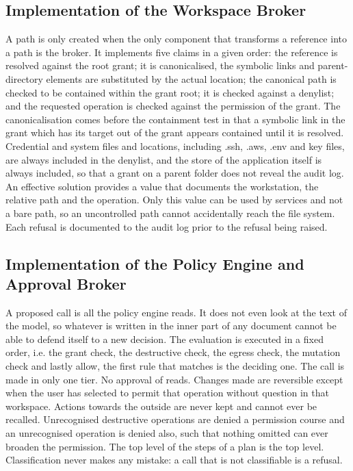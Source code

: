 \documentclass{FastFyp}
\begin{document}
\subsection{Implementation of the Workspace Broker}
A path is only created when the only component that transforms a reference into a path is the broker. It implements five claims in a given order: the reference is resolved against the root grant; it is canonicalised, the symbolic links and parent-directory elements are substituted by the actual location; the canonical path is checked to be contained within the grant root; it is checked against a denylist; and the requested operation is checked against the permission of the grant. The canonicalisation comes before the containment test in that a symbolic link in the grant which has its target out of the grant appears contained until it is resolved. Credential and system files and locations, including .ssh, .aws, .env and key files, are always included in the denylist, and the store of the application itself is always included, so that a grant on a parent folder does not reveal the audit log. An effective solution provides a value that documents the workstation, the relative path and the operation. Only this value can be used by services and not a bare path, so an uncontrolled path cannot accidentally reach the file system. Each refusal is documented to the audit log prior to the refusal being raised.

\subsection{Implementation of the Policy Engine and Approval Broker}
A proposed call is all the policy engine reads. It does not even look at the text of the model, so whatever is written in the inner part of any document cannot be able to defend itself to a new decision. The evaluation is executed in a fixed order, i.e. the grant check, the destructive check, the egress check, the mutation check and lastly allow, the first rule that matches is the deciding one. The call is made in only one tier. No approval of reads. Changes made are reversible except when the user has selected to permit that operation without question in that workspace. Actions towards the outside are never kept and cannot ever be recalled. Unrecognised destructive operations are denied a permission course and an unrecognised operation is denied also, such that nothing omitted can ever broaden the permission. The top level of the steps of a plan is the top level. Classification never makes any mistake: a call that is not classifiable is a refusal.
\end{document}

